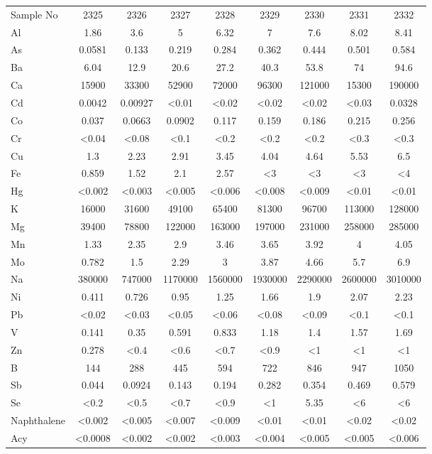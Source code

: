 \documentclass[algorithms,article,submit,pdftex,moreauthors]{Definitions/mdpi}
\begin{document}
\begin{scriptsize}
\begin{center}
\begin{longtable}{@{\extracolsep{\fill}}|p{1.8cm}|cccccccc|@{}}
Sample No & 2325 & 2326 & 2327 & 2328 & 2329 & 2330 & 2331 & 2332 \\
Al & 1.86 & 3.6 & 5 & 6.32 & 7 & 7.6 & 8.02 & 8.41 \\
As & 0.0581 & 0.133 & 0.219 & 0.284 & 0.362 & 0.444 & 0.501 & 0.584  \\
Ba & 6.04 & 12.9 & 20.6 & 27.2 & 40.3 & 53.8 & 74 & 94.6  \\
Ca & 15900 & 33300 & 52900 & 72000 & 96300 & 121000 & 15300 & 190000 \\
Cd & 0.0042 & 0.00927 & <0.01 & <0.02 & <0.02 & <0.02 & <0.03 & 0.0328 \\
Co & 0.037 & 0.0663 & 0.0902 & 0.117 & 0.159 & 0.186 & 0.215 & 0.256 \\
Cr & <0.04 & <0.08 & <0.1 & <0.2 & <0.2 & <0.2 & <0.3 & <0.3  \\
Cu & 1.3 & 2.23 & 2.91 & 3.45 & 4.04 & 4.64 & 5.53 & 6.5 \\
Fe & 0.859 & 1.52 & 2.1 & 2.57 & <3 & <3 & <3 & <4 \\
Hg & <0.002 & <0.003 & <0.005 & <0.006 & <0.008 & <0.009 & <0.01 & <0.01 \\
K & 16000 & 31600 & 49100 & 65400 & 81300 & 96700 & 113000 & 128000 \\
Mg & 39400 & 78800 & 122000 & 163000 & 197000 & 231000 & 258000 & 285000 \\
Mn & 1.33 & 2.35 & 2.9 & 3.46 & 3.65 & 3.92 & 4 & 4.05  \\
Mo & 0.782 & 1.5 & 2.29 & 3 & 3.87 & 4.66 & 5.7 & 6.9 \\
Na & 380000 & 747000 & 1170000 & 1560000 & 1930000 & 2290000 & 2600000 & 3010000 \\
Ni & 0.411 & 0.726 & 0.95 & 1.25 & 1.66 & 1.9 & 2.07 & 2.23 \\
Pb & <0.02 & <0.03 & <0.05 & <0.06 & <0.08 & <0.09 & <0.1 & <0.1 \\
V & 0.141 & 0.35 & 0.591 & 0.833 & 1.18 & 1.4 & 1.57 & 1.69 \\
Zn & 0.278 & <0.4 & <0.6 & <0.7 & <0.9 & <1 & <1 & <1  \\
B & 144 & 288 & 445 & 594 & 722 & 846 & 947 & 1050 \\
Sb & 0.044 & 0.0924 & 0.143 & 0.194 & 0.282 & 0.354 & 0.469 & 0.579  \\
Se & <0.2 & <0.5 & <0.7 & <0.9 & <1 & 5.35 & <6 & <6  \\
Naphthalene & <0.002 & <0.005 & <0.007 & <0.009 & <0.01 & <0.01 & <0.02 & <0.02 \\
Acy & <0.0008 & <0.002 & <0.002 & <0.003 & <0.004 & <0.005 & <0.005 & <0.006 \\

\end{longtable}
\end{center}
\end{scriptsize}
\end{document}
